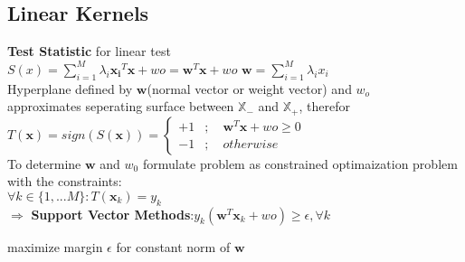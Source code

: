 \begin{sectionbox}
\subsection{Linear Kernels}
\textbf{Test Statistic} for linear test \\
$\boxed{S(x) = \sum_{i = 1}^{M}\lambda_i\mathbf{x_i}^T\mathbf{x} + wo = \mathbf{w}^T\mathbf{x} +wo}$ $\mathbf{w} = \sum_{i = 1}^{M}\lambda_ix_i$ \\
Hyperplane defined by $\mathbf{w}$(normal vector or weight vector) and $w_o$\\ approximates seperating surface between $\mathbb{X_-}$ and $\mathbb{X_+}$, therefor \\
$\boxed{T(\mathbf{x}) = sign(S(\mathbf{x})) = \begin{cases} 
			+1&;\quad \mathbf{w}^T\mathbf{x} +wo \geq 0\\
	        -1&;\quad otherwise
	\end{cases}}$\\ 
To determine $\mathbf{w}$ and $w_0$ formulate problem as constrained optimaization problem with the constraints: \\
$\forall k\in \{1,...M\}:T(\mathbf{x}_k)= y_k$ \\
$\Rightarrow$ \textbf{Support Vector Methods}:$\boxed{y_k(\mathbf{w}^T\mathbf{x}_k+wo)\geq \epsilon, \forall k}$ \begin{flushright}maximize margin $\epsilon$ for constant norm of $\mathbf{w}$ \end{flushright} 

\end{sectionbox}

